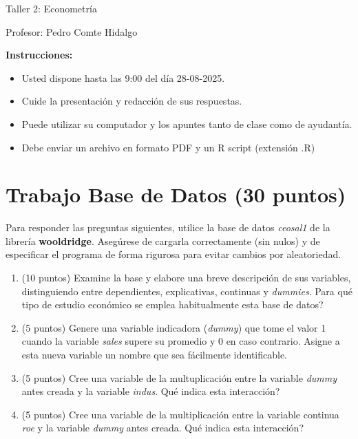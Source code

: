 \documentclass[letterpaper,11pt]{article}
\begin{document}
\begin{center}
    {\Large  Taller 2: Econometría }

Profesor:    Pedro Comte Hidalgo\\
\end{center}

\textbf{Instrucciones:} 

\begin{itemize}
    \item Usted dispone hasta las 9:00 del día 28-08-2025.
    \item Cuide la presentación y redacción de sus respuestas.
    \item Puede utilizar su computador y los apuntes tanto de clase como de ayudantía.
    \item Debe enviar un archivo en formato PDF y un R script (extensión .R)
\end{itemize}

\section{Trabajo Base de Datos (30 puntos)}

Para responder las preguntas siguientes, utilice la base de datos \textit{ceosal1} de la librería \textbf{wooldridge}. Asegúrese de cargarla correctamente (sin nulos) y de especificar el programa de forma rigurosa para evitar cambios por aleatoriedad.

\begin{enumerate}

\item (10 puntos) Examine la base y elabore una breve descripción de sus variables, distinguiendo entre dependientes, explicativas, continuas y \textit{dummies}. \textquestiondown Para qué tipo de estudio económico se emplea habitualmente esta base de datos?



    \item (5 puntos) Genere una variable indicadora (\textit{dummy}) que tome el valor 1 cuando la variable \textit{sales} supere su promedio y 0 en caso contrario. Asigne a esta nueva variable un nombre que sea fácilmente identificable.
    


    \item (5 puntos) Cree una variable de la multuplicación entre la variable \textit{dummy} antes creada y la variable \textit{indus}. \textquestiondown Qué indica esta interacción?




    \item (5 puntos) Cree una variable de la multiplicación entre la variable continua \textit{roe}  y la variable \textit{dummy} antes creada. \textquestiondown Qué indica esta interacción?


\end{enumerate}
\end{document}

